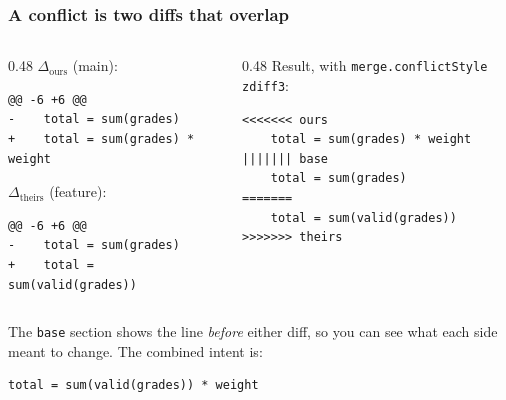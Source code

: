 \documentclass[aspectratio=169,10pt,compress]{beamer}
\newcommand{\cmd}[1]{\texttt{\color{gitred}#1}}
\begin{document}
\begin{frame}[t,fragile] \frametitle{A conflict is two diffs that overlap}
  \begin{columns}[T]
    \begin{column}{0.48\textwidth}
      \small $\Delta_{\text{ours}}$ (main):
\begin{lstlisting}[style=diff]
@@ -6 +6 @@
-    total = sum(grades)
+    total = sum(grades) * weight
\end{lstlisting}
      \small $\Delta_{\text{theirs}}$ (feature):
\begin{lstlisting}[style=diff]
@@ -6 +6 @@
-    total = sum(grades)
+    total = sum(valid(grades))
\end{lstlisting}
    \end{column}
    \begin{column}{0.48\textwidth}
      \small Result, with \cmd{merge.conflictStyle zdiff3}:
\begin{lstlisting}[language={}]
<<<<<<< ours
    total = sum(grades) * weight
||||||| base
    total = sum(grades)
=======
    total = sum(valid(grades))
>>>>>>> theirs
\end{lstlisting}
    \end{column}
  \end{columns}

  \vspace{0.3em}
  \small
  The \texttt{base} section shows the line \emph{before} either diff, so you can see
  what each side meant to change. The combined intent is:
\begin{lstlisting}[language={}]
    total = sum(valid(grades)) * weight
\end{lstlisting}
\end{frame}
\end{document}
